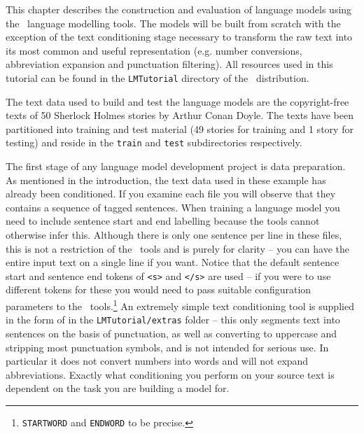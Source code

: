 %
%
%


This chapter describes the construction and evaluation of language
models using the \HTK\ language modelling tools. The models will be
built from scratch with the exception of the text conditioning stage
necessary to transform the raw text into its most common and useful
representation (e.g. number conversions, abbreviation expansion and
punctuation filtering). All resources used in this tutorial can be
found in the \texttt{LMTutorial} directory of the \HTK\ distribution.

The text data used to build and test the language models are the
copyright-free texts of 50 Sherlock Holmes stories by Arthur Conan Doyle.
The texts have been partitioned into training and test material (49
stories for training and 1 story for testing) and reside in the
\texttt{train} and \texttt{test} subdirectories respectively.


The first stage of any language model development project is data
preparation. As mentioned in the introduction, the text data used in
these example has already been conditioned.  If you examine each file
you will observe that they contains a sequence of tagged sentences.
When training a language model you need to include sentence start and
end labelling because the tools cannot otherwise infer this.  Although
there is only one sentence per line in these files, this is not a
restriction of the \HTK\ tools and is purely for clarity -- you can
have the entire input text on a single line if you want.  Notice that
the default sentence start and sentence end tokens of {\tt <s>} and
{\tt </s>} are used -- if you were to use different tokens for these
you would need to pass suitable configuration parameters to the \HTK\
tools.\footnote{{\tt STARTWORD} and {\tt ENDWORD} to be precise.}  An
extremely simple text conditioning tool is supplied in the form of
\htool{LCond.pl} in the {\tt LMTutorial/extras} folder -- this only
segments text into sentences on the basis of punctuation, as well as
converting to uppercase and stripping most punctuation symbols, and is
not intended for serious use.  In particular it does not convert
numbers into words and will not expand abbreviations.  Exactly what
conditioning you perform on your source text is dependent on the task
you are building a model for.

